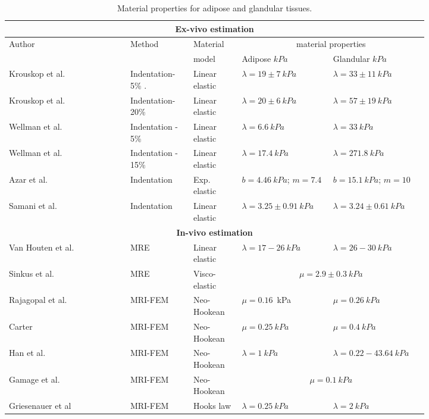 \begin{table}[!h]
\centering
\begin{tabular}{|p{0.25\linewidth}|p{0.13\linewidth}|p{0.1\linewidth}|p{0.17\linewidth}|p{0.17\linewidth}|}
 \hline
\multicolumn{5}{|c|}{\textbf{Ex-vivo estimation}}\\ \hline

\multirow{2}{*}{ Author} & \multirow{2}{*}{ Method} &  Material & \multicolumn{2}{c|}{material properties}\\  \cline{4-5}

&& model &Adipose $kPa$ & Glandular $kPa$ \\  \hline

Krouskop et al. \citep{krouskop_elastic_1998} & Indentation-5\% . & Linear elastic & $\lambda=19 \pm 7\ kPa$ &$ \lambda =33 \pm 11\ kPa$ \\ \hline
Krouskop et al. \citep{krouskop_elastic_1998}   & Indentation- 20\%& Linear elastic & $\lambda=20 \pm 6\ kPa  $& $\lambda= 57 \pm 19\ kPa $ \\  \hline
 Wellman et al. \citep{wellman_breast_1999}  & Indentation - 5\% & Linear elastic & $\lambda=6.6\ kPa $ & $\lambda= 33 \ kPa$\\ \hline
 Wellman et al. \citep{wellman_breast_1999}  & Indentation - 15\% & Linear elastic &$ \lambda = 17.4\ kPa $& $\lambda= 271.8\ kPa $ \\ \hline
 Azar et al. \citep{azar_methods_2002} & Indentation & Exp. elastic & $b = 4.46\ kPa$; $m=7.4$ & $b = 15.1\ kPa$; $m=10$ \\ \hline
 Samani et al. \citep{samani_method_2004} & Indentation & Linear elastic & $\lambda= 3.25 \pm 0.91\ kPa $ & $\lambda= 3.24 \pm 0.61\ kPa $ \\ \hline \hline
 \multicolumn{5}{|c|}{\textbf{In-vivo estimation}}\\ \hline
Van Houten et al. \citep{van_initial_2003} & MRE & Linear elastic & $\lambda= 17-26\ kPa $ & $\lambda= 26-30\ kPa $ \\ \hline
 Sinkus et al. \citep{sinkus_viscoelastic_2005}&MRE& Visco-elastic & \multicolumn{2}{|c|}{$\mu = 2.9 \pm 0.3\ kPa$} \\ \hline
 Rajagopal et al. \citep{rajagopal_creating_2008}  & MRI-FEM& Neo-Hookean & $\mu = 0.16$\ kPa & $\mu = 0.26\ kPa$ \\ \hline
 Carter \citep{carter_determining_2009} & MRI-FEM& Neo-Hookean &$\mu = 0.25\ kPa$ & $\mu = 0.4\ kPa$ \\ \hline
 Han et al. \citep{han_development_2012} & MRI-FEM & Neo-Hookean & $\lambda= 1\ kPa$ & $\lambda = 0.22-43.64\ kPa $ \\ \hline 
 Gamage et al.\citep{gamage_modelling_2012} & MRI-FEM & Neo-Hookean & \multicolumn{2}{|c|}{$\mu = 0.1\ kPa $} \\ \hline
Griesenauer et al \citep{griesenauer_breast_2017} & MRI-FEM & Hooks law & $\lambda= 0.25\ kPa$ & $\lambda= 2\ kPa$\\ \hline
\end{tabular}
\caption{Material properties for adipose and glandular tissues.}
\label{table:materialproperties}
\end{table}

